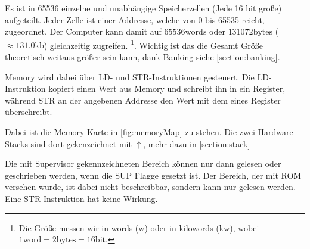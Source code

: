 \documentclass{scrartcl}
\begin{document}
Es ist in 65536 einzelne und unabhängige Speicherzellen (Jede 16 bit große) aufgeteilt. Jeder Zelle ist einer Addresse, welche von 0 bis 65535 reicht, zugeordnet. Der Computer kann damit auf $65536 \text{words}$ oder $131072 \text{bytes}$ ($\approx 131.0 \text{kb}$) gleichzeitig zugreifen.
\footnote{Die Größe messen wir in words (w) oder in kilowords (kw), wobei $1 \text{word} = 2 \text{bytes} = 16 \text{bit}$.}. Wichtig ist das die Gesamt Größe theoretisch weitaus größer sein kann, dank Banking siehe \autoref{section:banking}.

Memory wird dabei über LD- und STR-Instruktionen gesteuert. Die LD-Instruktion kopiert einen Wert aus Memory und schreibt ihn in ein Register, während STR an der angebenen Addresse den Wert mit dem eines Register überschreibt.

Dabei ist die Memory Karte in \autoref{fig:memoryMap} zu stehen. Die zwei Hardware Stacks sind dort gekenzeichnet mit $\uparrow$, mehr dazu in \autoref{section:stack}

Die mit Supervisor gekennzeichneten Bereich können nur dann gelesen oder geschrieben werden, wenn die SUP Flagge gesetzt ist. Der Bereich, der mit ROM versehen wurde, ist dabei nicht beschreibbar, sondern kann nur gelesen werden. Eine STR Instruktion hat keine Wirkung.
\end{document}
